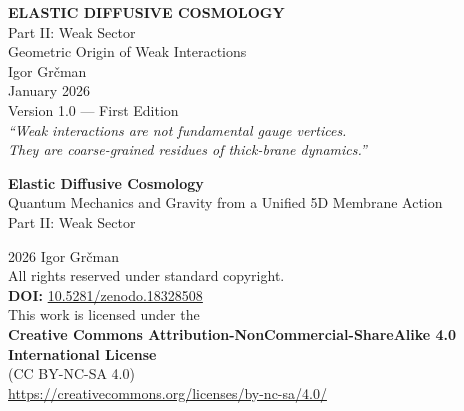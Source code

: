 \documentclass[11pt,a4paper]{book}
\theoremstyle{definition}
\theoremstyle{remark}
\begin{document}
\frontmatter

\begin{titlepage}
\centering
\vspace*{2cm}
{\Huge\bfseries ELASTIC DIFFUSIVE COSMOLOGY}\\[1.5cm]
{\Large Part II: Weak Sector}\\[0.5cm]
{\large Geometric Origin of Weak Interactions}\\[2cm]
{\Large Igor Gr\v{c}man}\\[1cm]
{\large January 2026}\\[0.5cm]
{\small Version 1.0 --- First Edition}\\[2cm]
\vfill
{\large\itshape ``Weak interactions are not fundamental gauge vertices.\\
They are coarse-grained residues of thick-brane dynamics.''}
\end{titlepage}

\newpage
\thispagestyle{empty}
\vspace*{3cm}

\begin{center}
{\Large\bfseries Elastic Diffusive Cosmology}\\[0.3cm]
{\normalsize Quantum Mechanics and Gravity from a Unified 5D Membrane Action}\\[0.5cm]
{\large Part II: Weak Sector}\\[1.5cm]
\end{center}

\noindent\textcopyright{} 2026 Igor Gr\v{c}man\\[0.3cm]
All rights reserved under standard copyright.\\[0.5cm]

\noindent\textbf{DOI:} \href{https://doi.org/10.5281/zenodo.18328508}{10.5281/zenodo.18328508}\\[1cm]

\noindent This work is licensed under the\\[0.2cm]
\textbf{Creative Commons Attribution-NonCommercial-ShareAlike 4.0 International License}\\
(CC BY-NC-SA 4.0)~\cite{CCBYNCSA40}\\[0.3cm]
\url{https://creativecommons.org/licenses/by-nc-sa/4.0/}\\[1cm]
\end{document}
